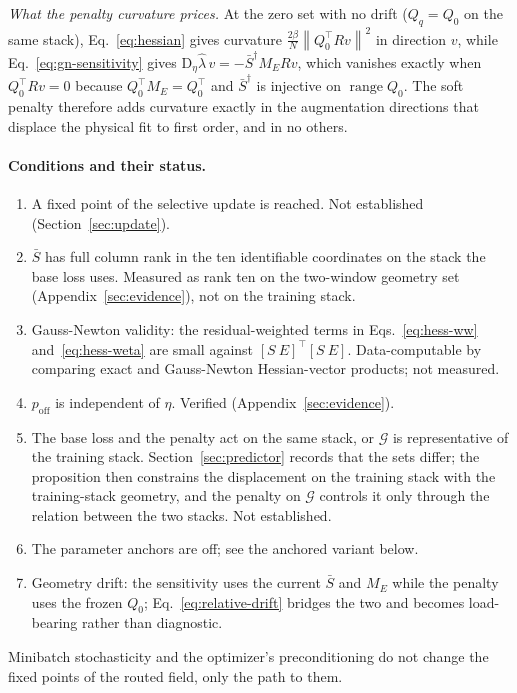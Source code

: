 \documentclass[11pt,a4paper]{article}
\newcommand{\D}{\mathrm D}
\newcommand{\ran}{\operatorname{range}}
\newcommand{\norm}[1]{\left\lVert#1\right\rVert}
\newcommand{\off}{\mathrm{off}}
\theoremstyle{remark}
\begin{document}
\emph{What the penalty curvature prices.} At the zero set with no drift ($Q_q=Q_0$ on the same stack), Eq.~\eqref{eq:hessian} gives curvature $\tfrac{2\beta}{N}\norm{Q_0^\top Rv}^2$ in direction $v$, while Eq.~\eqref{eq:gn-sensitivity} gives $\D_\eta\hat\lambda\,v=-\bar S^\dagger M_ERv$, which vanishes exactly when $Q_0^\top Rv=0$ because $Q_0^\top M_E=Q_0^\top$ and $\bar S^\dagger$ is injective on $\ran Q_0$. The soft penalty therefore adds curvature exactly in the augmentation directions that displace the physical fit to first order, and in no others.

\paragraph{Conditions and their status.}
\begin{enumerate}
\item A fixed point of the selective update is reached. Not established (Section~\ref{sec:update}).
\item $\bar S$ has full column rank in the ten identifiable coordinates on the stack the base loss uses. Measured as rank ten on the two-window geometry set (Appendix~\ref{sec:evidence}), not on the training stack.
\item Gauss-Newton validity: the residual-weighted terms in Eqs.~\eqref{eq:hess-ww} and~\eqref{eq:hess-weta} are small against $[S\ E]^\top[S\ E]$. Data-computable by comparing exact and Gauss-Newton Hessian-vector products; not measured.
\item $p_\off$ is independent of $\eta$. Verified (Appendix~\ref{sec:evidence}).
\item The base loss and the penalty act on the same stack, or $\mathcal G$ is representative of the training stack. Section~\ref{sec:predictor} records that the sets differ; the proposition then constrains the displacement on the training stack with the training-stack geometry, and the penalty on $\mathcal G$ controls it only through the relation between the two stacks. Not established.
\item The parameter anchors are off; see the anchored variant below.
\item Geometry drift: the sensitivity uses the current $\bar S$ and $M_E$ while the penalty uses the frozen $Q_0$; Eq.~\eqref{eq:relative-drift} bridges the two and becomes load-bearing rather than diagnostic.
\end{enumerate}
Minibatch stochasticity and the optimizer's preconditioning do not change the fixed points of the routed field, only the path to them.
\end{document}
